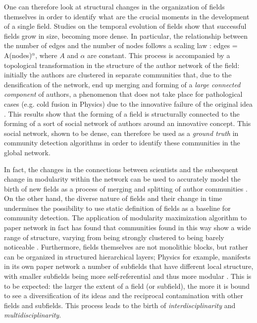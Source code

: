 One can therefore look at structural changes in the organization of fields
themselves in order to identify what are the crucial moments in the development of a single field. Studies on the temporal evolution of fields show that successful fields
grow in size, becoming more dense. In particular, the relationship between the number of edges and the number of nodes follows a scaling law :
edges = A(nodes)$^{\alpha}$, where $A$ and $\alpha$ are constant. This process is accompanied by a topological
transformation in the structure of the author network of the field: initially the authors are clustered in separate communities that, due to the densification
of the network, end up merging and forming of a \textit{large connected component} of authors, a phenomenon that does not take place for pathological cases (e.g. cold fusion in Physics)
due to the innovative failure of the original idea \cite{Bettencourt2009210}. This results show that the forming of a field is structurally connected to the forming of a sort of social network of authors
around an innovative concept. This social network, shown to be dense, can therefore be used as a \textit{ground truth} in community detection algorithms in order
to identify these communities in the global network. 

In fact, the changes in the connections between scientists and the subsequent change in modularity within the network
can be used to accurately model the birth of new fields as a process of merging and splitting of author communities \cite{Sun2013}. On the other hand, the diverse nature of fields
and their change in time undermines the possibility to use static definition of fields as a baseline for community detection. The application of modularity maximization
algorithm to paper network in fact has found that communities found in this way show a wide range of structure, varying from being strongly clustered to being barely noticeable \cite{Chen2010278}.
Furthermore, fields themselves are not monolithic blocks, but rather can be organized in structured hierarchical layers; Physics for example, manifests in its 
own paper network a number of subfields that have different local structure, with smaller subfields being more self-referential and thus more modular \cite{Sinatra2015}. This is to be expected:
the larger the extent of a field (or subfield), the more it is bound to see a diversification of its ideas and the reciprocal contamination with other fields and subfields. This process
leads to the birth of \textit{interdisciplinarity} and \textit{multidisciplinarity}.

